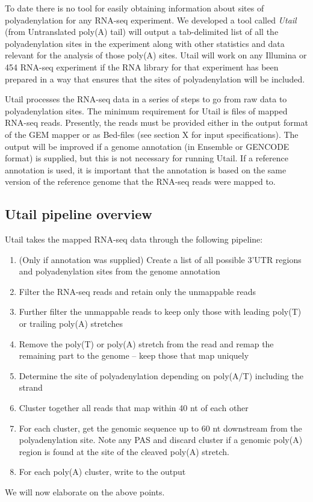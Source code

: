 %
To date there is no tool for easily obtaining information about sites of
polyadenylation for any RNA-seq experiment. We developed a tool called
\textit{Utail} (from Untranslated poly(A) tail) will output a tab-delimited
list of all the polyadenylation sites in the experiment along with other
statistics and data relevant for the analysis of those poly(A) sites. Utail
will work on any Illumina or 454 RNA-seq experiment if the RNA library for that
experiment has been prepared in a way that ensures that the sites of
polyadenylation will be included.

Utail processes the RNA-seq data in a series of steps to go from raw data to
polyadenylation sites. The minimum requirement for Utail is files of mapped
RNA-seq reads. Presently, the reads must be provided either in the output
format of the GEM mapper \cite{ribeca_gem_2010} or as Bed-files (see section X
for input specifications). The output will be improved if a genome annotation
(in Ensemble or GENCODE format) is supplied, but this is not necessary for
running Utail. If a reference annotation is used, it is important that the
annotation is based on the same version of the reference genome that the
RNA-seq reads were mapped to.

\subsection{Utail pipeline overview}

Utail takes the mapped RNA-seq data through the following pipeline:
\begin{enumerate}
	\item (Only if annotation was supplied) Create a list of all possible
		3'UTR regions and polyadenylation sites from the genome annotation
	\item Filter the RNA-seq reads and retain only the unmappable reads
	\item Further filter the unmappable reads to keep only those with leading
		poly(T) or trailing poly(A) stretches
	\item Remove the poly(T) or poly(A) stretch from the read and remap the
		remaining part to the genome -- keep those that map uniquely
	\item Determine the site of polyadenylation depending on poly(A/T)
		including the strand
	\item Cluster together all reads that map within 40 nt of each other
	\item For each cluster, get the genomic sequence up to 60 nt downstream
		from the polyadenylation site. Note any PAS and discard cluster if a
		genomic poly(A) region is found at the site of the cleaved poly(A)
		stretch.
	\item For each poly(A) cluster, write to the output
\end{enumerate}
We will now elaborate on the above points.\\

